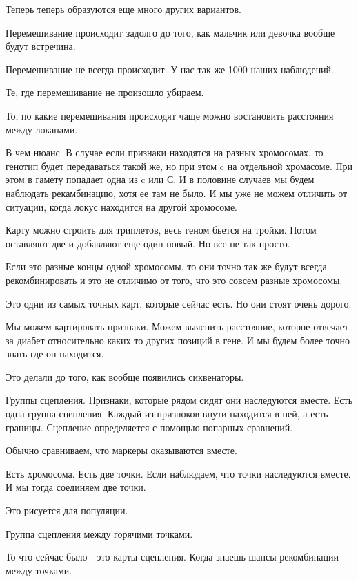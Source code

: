 \begin{description}
Теперь теперь образуются еще много других вариантов. 

\TODO %

Перемешивание происходит задолго до того, 
как мальчик или девочка вообще будут встречина. 

Перемешивание не всегда происходит. У нас 
так же 1000 наших наблюдений.

Те, где перемешивание не произошло убираем. 

То, по какие перемешивания происходят чаще 
можно востановить расстояния между локанами. 

\TODO %

В чем нюанс. В случае если признаки находятся на
разных хромосомах, то генотип будет передаваться такой же,
но при этом c на отдельной хромасоме. При этом в гамету
попадает одна из c или С. И в половине
случаев мы будем наблюдать рекамбинацию,
хотя ее там не было. И мы уже не можем
отличить от ситуации, когда локус находится на другой хромосоме.

Карту можно строить для триплетов, весь геном
бьется на тройки. Потом оставляют две и добавляют еще
один новый. Но все не так просто.

Если это разные концы одной хромосомы, то они точно так же
будут всегда рекомбинировать и это не отличимо от
того, что это совсем разные хромосомы.

Это одни из самых точных карт, которые сейчас есть. Но
они стоят очень дорого.

Мы можем картировать признаки. Можем выяснить расстояние, которое
отвечает за диабет относительно каких то других позиций в гене.
И мы будем более точно знать где он находится.

Это делали до того, как вообще появились сиквенаторы.

 
Группы сцепления. Признаки, которые рядом сидят 
они наследуются вместе. Есть одна группа сцепления. 
Каждый из призноков внути находится в ней, а есть 
границы. Сцепление определяется с помощью попарных сравнений. 

Обычно сравниваем, что маркеры оказываются вместе. 

Есть хромосома. Есть две точки. Если наблюдаем, что 
точки наследуются вместе. И мы тогда соединяем две точки. 

Это рисуется для популяции. 

Группа сцепления между горячими точками. 


То что сейчас было - это 
карты сцепления. Когда знаешь шансы рекомбинации между точками. 



\end{description}
